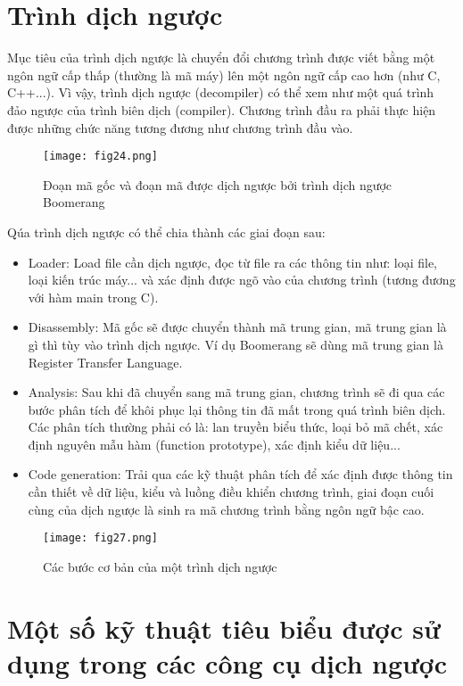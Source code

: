 \section{Trình dịch ngược}
Mục tiêu của trình dịch ngược là chuyển đổi chương trình được viết bằng một ngôn ngữ cấp thấp (thường là mã máy) lên một ngôn ngữ cấp cao hơn (như C, C++...). Vì vậy, trình dịch ngược (decompiler) có thể xem như một quá trình đảo ngược của trình biên dịch (compiler). Chương trình đầu ra phải thực hiện được những chức năng tương đương như chương trình đầu vào. \\

\begin{figure}[h]
	\centering
	\texttt{[image: fig24.png]}
	\caption{Đoạn mã gốc và đoạn mã được dịch ngược bởi trình dịch ngược Boomerang}
\end{figure}

Qúa trình dịch ngược có thể chia thành các giai đoạn sau:
\begin{itemize}
	\item Loader: Load file cần dịch ngược, đọc từ file ra các thông tin như: loại file, loại kiến trúc máy... và xác định được ngõ vào của chương trình (tương đương với hàm main trong C).
	\item Disassembly: Mã gốc sẽ được chuyển thành mã trung gian, mã trung gian là gì thì tùy vào trình dịch ngược. Ví dụ Boomerang sẽ dùng mã trung gian là Register Transfer Language.
	\item Analysis: Sau khi đã chuyển sang mã trung gian, chương trình sẽ đi qua các bước phân tích để khôi phục lại thông tin đã mất trong quá trình biên dịch. Các phân tích thường phải có là: lan truyền biểu thức, loại bỏ mã chết, xác định nguyên mẫu hàm (function prototype), xác định kiểu dữ liệu...
	\item Code generation: Trải qua các kỹ thuật phân tích để xác định được thông tin cần thiết về dữ liệu, kiểu và luồng điều khiển chương trình, giai đoạn cuối cùng của dịch ngược là sinh ra mã chương trình bằng ngôn ngữ bậc cao. 
\end{itemize}
\begin{figure}[h]
	\centering
	\texttt{[image: fig27.png]}
	\caption{Các bước cơ bản của một trình dịch ngược}
\end{figure}
\section{Một số kỹ thuật tiêu biểu được sử dụng trong các công cụ dịch ngược}
